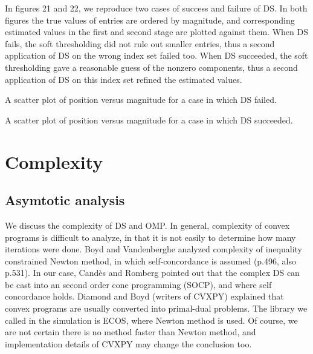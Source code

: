 In figures 21 and 22, we reproduce two cases of success and failure of DS.
In both figures the true values of  entries are ordered by magnitude, and corresponding estimated values in the first and second stage are plotted against them.
When DS fails, the soft thresholding did not rule out smaller entries, thus a second application of DS on the wrong index set failed too.
When DS succeeded, the soft thresholding gave a reasonable guess of the nonzero components, thus a second application of DS on this index set refined the estimated values.

\blank [big]
\caption {A scatter plot of position versus magnitude for a case in which DS failed.}
\blank [big]

\blank [big]
\caption {A scatter plot of position versus magnitude for a case in which DS succeeded.}
\blank [big]



\section {Complexity}

\subsection {Asymtotic analysis}

We discuss the complexity of DS and OMP.
In general, complexity of convex programs is difficult to analyze, in that it is not easily to determine how many iterations were done.
Boyd and Vandenberghe \cite {BoV04} analyzed complexity of inequality constrained Newton method, in which self-concordance is assumed (p.496, also p.531).
In our case, Candès and Romberg \cite {CaR05} pointed out that the complex DS can be cast into an second order cone programming (SOCP), and where self concordance holds.
Diamond and Boyd (writers of CVXPY) \cite {DiB16} explained that convex programs are usually converted into primal-dual problems.
The library we called in the simulation is ECOS, where Newton method is used.
Of course, we are not certain there is no method faster than Newton method, and implementation details of CVXPY may change the conclusion too.

